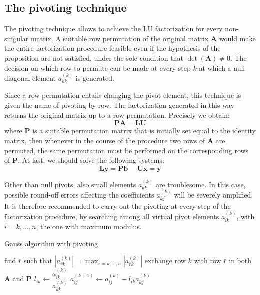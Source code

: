 \documentclass[12pt, a4paper]{report}
\begin{document}
    \subsection{The pivoting technique}
    The pivoting technique allows to achieve the LU factorization for every non-singular matrix. A suitable row permutation of the 
    original matrix $\boldsymbol{A}$ would make the entire factorization procedure feasible even if the hypothesis of the proposition
    are not satisfied, under the sole condition that $\det(\boldsymbol{A}) \neq 0$. The decision on which row to permute can be made 
    at every step $k$ at which a null diagonal element $a_{kk}^{(k)}$ is generated. 

    Since a row permutation entails changing the pivot element, this technique is given the name of pivoting by row. The factorization 
    generated in this way returns the original matrix up to a row permutation. Precisely we obtain: 
    \[\boldsymbol{PA}=\boldsymbol{LU}\]
    where $\boldsymbol{P}$ is a suitable permutation matrix that is initially set equal to the identity matrix, then whenever in the 
    course of the procedure two rows of $\boldsymbol{A}$ are permuted, the same permutation must be performed on the corresponding rows
    of $\boldsymbol{P}$. At last, we should solve the following systems: 
    \[\boldsymbol{Ly}=\boldsymbol{Pb} \:\:\:\:\:\: \boldsymbol{Ux}=\boldsymbol{y}\]

    Other than null pivots, also small elements $a_{kk}^{(k)}$ are troublesome. In this case, possible round-off errors affecting the 
    coefficients $a_{kj}^{(k)}$ will be severely amplified. It is therefore recommended to carry out the pivoting at every step of the
    factorization procedure, by searching among all virtual pivot elements $a_{ik}^{(k)}$, with $i=k,\dots,n$, the one with maximum 
    modulus. 
    \begin{algorithm}[H]
        \caption{Gauss algorithm with pivoting}
            \begin{algorithmic}[1]
                    \State find $\overline{r}$ such that $\left\lvert a_{\overline{r}k}^{(k)} \right\rvert=\max_{r=k,\dots,n}\left\lvert a_{rk}^{(k)} \right\rvert$
                    \State exchange row $k$ with row $\overline{r}$ in both $\boldsymbol{A}$ and $\boldsymbol{P}$
                        \State $l_{ik} \leftarrow \dfrac{a_{ik}^{(k)}}{a_{kk}^{(k)}}$
                            \State $a_{ij}^{(k+1)} \leftarrow a_{ij}^{(k)}-l_{ik}a_{kj}^{(k)}$
                        \EndFor
                    \EndFor
                \EndFor
            \end{algorithmic}
    \end{algorithm}
\end{document}
